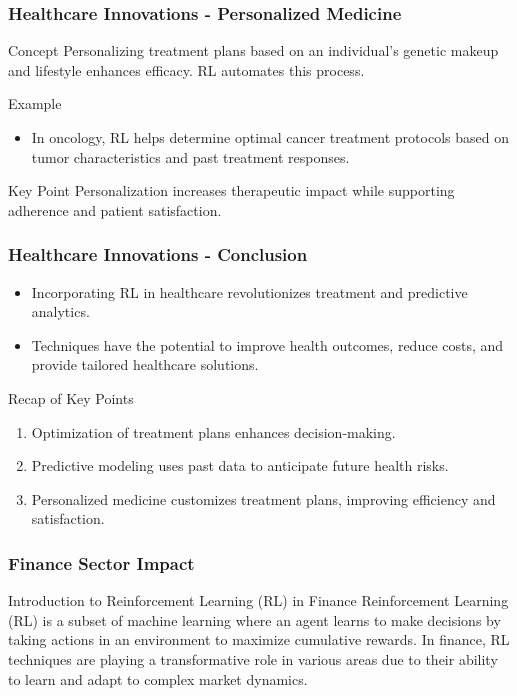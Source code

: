 \documentclass[aspectratio=169]{beamer}
\begin{document}
\begin{frame}[fragile]
    \frametitle{Healthcare Innovations - Personalized Medicine}
    \begin{block}{Concept}
        Personalizing treatment plans based on an individual's genetic makeup and lifestyle enhances efficacy. RL automates this process.
    \end{block}
    \begin{exampleblock}{Example}
        \begin{itemize}
            \item In oncology, RL helps determine optimal cancer treatment protocols based on tumor characteristics and past treatment responses.
        \end{itemize}
    \end{exampleblock}
    \begin{block}{Key Point}
        Personalization increases therapeutic impact while supporting adherence and patient satisfaction.
    \end{block}
\end{frame}

\begin{frame}[fragile]
    \frametitle{Healthcare Innovations - Conclusion}
    \begin{itemize}
        \item Incorporating RL in healthcare revolutionizes treatment and predictive analytics.
        \item Techniques have the potential to improve health outcomes, reduce costs, and provide tailored healthcare solutions.
    \end{itemize}
    \begin{block}{Recap of Key Points}
        \begin{enumerate}
            \item Optimization of treatment plans enhances decision-making.
            \item Predictive modeling uses past data to anticipate future health risks.
            \item Personalized medicine customizes treatment plans, improving efficiency and satisfaction.
        \end{enumerate}
    \end{block}
\end{frame}

\begin{frame}[fragile]
    \frametitle{Finance Sector Impact}
    \begin{block}{Introduction to Reinforcement Learning (RL) in Finance}
        Reinforcement Learning (RL) is a subset of machine learning where an agent learns to make decisions by taking actions in an environment to maximize cumulative rewards.
        In finance, RL techniques are playing a transformative role in various areas due to their ability to learn and adapt to complex market dynamics.
    \end{block}
\end{frame}
\end{document}
